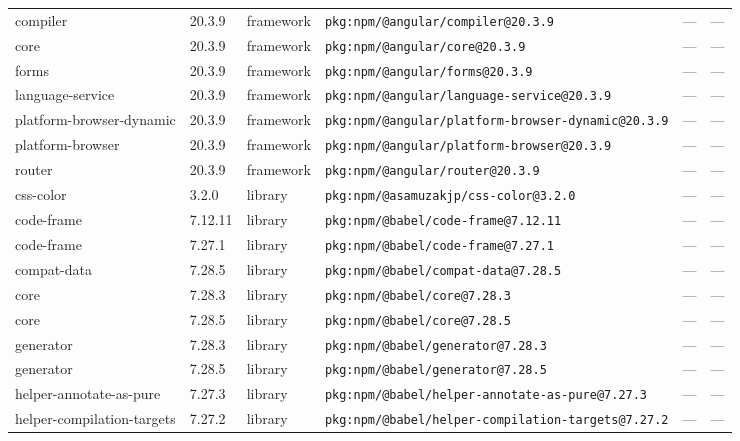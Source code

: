 \documentclass[11pt,a4paper]{article}
\begin{document}
\begin{longtable}{|p{4cm}|p{2cm}|p{1.6cm}|p{5cm}|p{1.5cm}|p{3.5cm}|}
\raggedright compiler & 20.3.9 & framework & \small\texttt{pkg:npm/@angular/compiler@20.3.9} & — & \small — \\
\raggedright core & 20.3.9 & framework & \small\texttt{pkg:npm/@angular/core@20.3.9} & — & \small — \\
\raggedright forms & 20.3.9 & framework & \small\texttt{pkg:npm/@angular/forms@20.3.9} & — & \small — \\
\raggedright language-service & 20.3.9 & framework & \small\texttt{pkg:npm/@angular/language-service@20.3.9} & — & \small — \\
\raggedright platform-browser-dynamic & 20.3.9 & framework & \small\texttt{pkg:npm/@angular/platform-browser-dynamic@20.3.9} & — & \small — \\
\raggedright platform-browser & 20.3.9 & framework & \small\texttt{pkg:npm/@angular/platform-browser@20.3.9} & — & \small — \\
\raggedright router & 20.3.9 & framework & \small\texttt{pkg:npm/@angular/router@20.3.9} & — & \small — \\
\raggedright css-color & 3.2.0 & library & \small\texttt{pkg:npm/@asamuzakjp/css-color@3.2.0} & — & \small — \\
\raggedright code-frame & 7.12.11 & library & \small\texttt{pkg:npm/@babel/code-frame@7.12.11} & — & \small — \\
\raggedright code-frame & 7.27.1 & library & \small\texttt{pkg:npm/@babel/code-frame@7.27.1} & — & \small — \\
\raggedright compat-data & 7.28.5 & library & \small\texttt{pkg:npm/@babel/compat-data@7.28.5} & — & \small — \\
\raggedright core & 7.28.3 & library & \small\texttt{pkg:npm/@babel/core@7.28.3} & — & \small — \\
\raggedright core & 7.28.5 & library & \small\texttt{pkg:npm/@babel/core@7.28.5} & — & \small — \\
\raggedright generator & 7.28.3 & library & \small\texttt{pkg:npm/@babel/generator@7.28.3} & — & \small — \\
\raggedright generator & 7.28.5 & library & \small\texttt{pkg:npm/@babel/generator@7.28.5} & — & \small — \\
\raggedright helper-annotate-as-pure & 7.27.3 & library & \small\texttt{pkg:npm/@babel/helper-annotate-as-pure@7.27.3} & — & \small — \\
\raggedright helper-compilation-targets & 7.27.2 & library & \small\texttt{pkg:npm/@babel/helper-compilation-targets@7.27.2} & — & \small — \\

\end{longtable}
\end{document}
